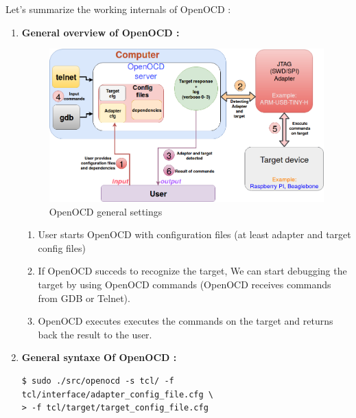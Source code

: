 Let's summarize the working internals of OpenOCD : 

\begin{enumerate}
	\item \textbf{General overview of OpenOCD : } 
		\begin{figure}[H]
			\centering
        	\includegraphics[scale=0.32]{img/solution/openOCDDiagram.png}
        	\caption{OpenOCD general settings}
        	\label{Navigating through /proc/kcore using gdb}
    	\end{figure}
	
		\begin{enumerate}
			\item {User starts OpenOCD with configuration files (at least adapter and target config files)}
			
			\item {If OpenOCD succeds to recognize the target, We can start debugging the target by using OpenOCD commands (OpenOCD receives commands from GDB or Telnet)}.
			
			\item {OpenOCD executes executes the commands on the target and returns back the result to the user}.
		\end{enumerate}		
	
	\item \textbf{General syntaxe Of OpenOCD : }	
	
	\begin{lstlisting}[style=BashInputStyle]	
$ sudo ./src/openocd -s tcl/ -f tcl/interface/adapter_config_file.cfg \ 
> -f tcl/target/target_config_file.cfg	
	\end{lstlisting}
		

\end{enumerate}
